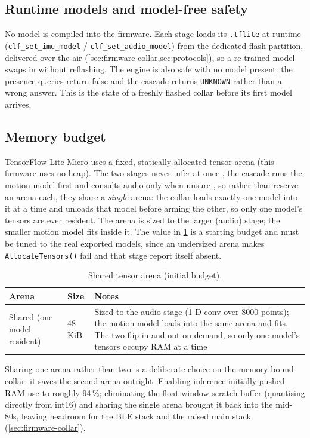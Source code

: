 \subsection{Runtime models and model-free safety}

No model is compiled into the firmware. Each stage loads its \texttt{.tflite} at runtime
(\texttt{clf\_set\_imu\_model} / \texttt{clf\_set\_audio\_model}) from the dedicated flash partition,
delivered over the air (\cref{sec:firmware-collar,sec:protocols}), so a re-trained model swaps in
without reflashing. The engine is also safe with no model present: the presence queries return false
and the cascade returns \texttt{UNKNOWN} rather than a wrong answer. This is the state of a freshly
flashed collar before its first model arrives.

\subsection{Memory budget}

TensorFlow Lite Micro uses a fixed, statically allocated tensor arena (this firmware uses no heap).
The two stages never infer at once , the cascade runs the motion model first and consults audio only
when unsure , so rather than reserve an arena each, they share a \emph{single} arena: the collar loads
exactly one model into it at a time and unloads that model before arming the other, so only one
model's tensors are ever resident. The arena is sized to the larger (audio) stage; the smaller motion
model fits inside it. The value in \cref{tab:arenas} is a starting budget and must be tuned to the
real exported models, since an undersized arena makes \texttt{AllocateTensors()} fail and that stage
report itself absent.

\begin{table}[ht]
  \centering
  \caption{Shared tensor arena (initial budget).}
  \label{tab:arenas}
  \begin{tabularx}{\textwidth}{@{}llX@{}}
    \toprule
    \textbf{Arena} & \textbf{Size} & \textbf{Notes} \\
    \midrule
    Shared (one model resident) & 48\,KiB & Sized to the audio stage (1-D conv over 8000 points); the
      motion model loads into the same arena and fits. The two flip in and out on demand, so only one
      model's tensors occupy RAM at a time \\
    \bottomrule
  \end{tabularx}
\end{table}

Sharing one arena rather than two is a deliberate choice on the memory-bound collar: it saves the
second arena outright. Enabling inference initially pushed RAM use to roughly 94\,\%; eliminating the
float-window scratch buffer (quantising directly from int16) and sharing the single arena brought it
back into the mid-80s, leaving headroom for the BLE stack and the raised main stack
(\cref{sec:firmware-collar}).
